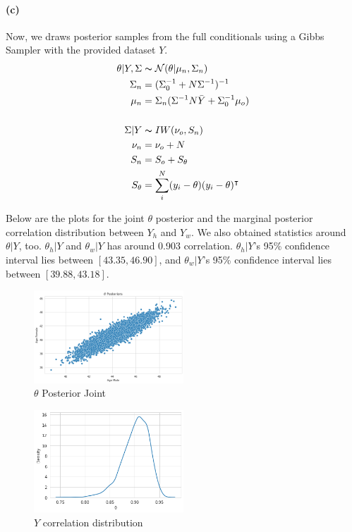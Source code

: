 \documentclass[11pt, letterpaper]{article}
\begin{document}
\paragraph{(c)}
Now, we draws posterior samples from the full conditionals using a Gibbs Sampler with the provided dataset $Y$.
\begin{align*}
    \theta|Y, \Sigma &\thicksim \mathcal{N}(\theta|\mu_n, \Sigma_n) \\
    \Sigma_n &= (\Sigma_0^{-1} + N \Sigma^{-1})^{-1} \\
    \mu_n &= \Sigma_n (\Sigma^{-1}N\bar{Y} + \Sigma_0^{-1}\mu_o) \\ \\
    \Sigma|Y &\thicksim IW(\nu_o, S_n) \\
    \nu_n &= \nu_o + N \\
    S_n &= S_o + S_\theta \\
    S_\theta &= \sum_i^N (y_i - \theta)(y_i - \theta)^{\intercal}
\end{align*}

Below are the plots for the joint $\theta$ posterior and the marginal posterior correlation distribution between $Y_h$ and $Y_w$.
We also obtained statistics around $\theta|Y$, too. $\theta_h|Y$ and $\theta_w|Y$ has around 0.903 correlation. $\theta_h|Y$'s
95\% confidence interval lies between $[43.35, 46.90]$, and $\theta_w|Y$'s 95\% confidence interval lies between $[39.88, 43.18]$.
\begin{figure}[!h]
  \centering
  \includegraphics[width=0.5\textwidth]{1.b.png}
  \captionsetup{justification=centering}
  \caption{$\theta$ Posterior Joint}
\end{figure}
\begin{figure}[!h]
  \centering
  \includegraphics[width=0.5\textwidth]{1.c.png}
  \captionsetup{justification=centering}
  \caption{$Y$ correlation distribution}
\end{figure}
\end{document}
